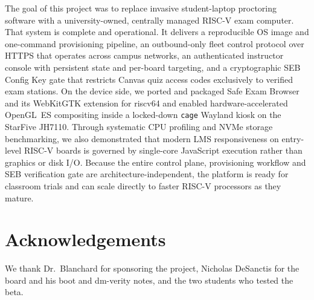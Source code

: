 \documentclass[11pt]{article}
\begin{document}
The goal of this project was to replace invasive student-laptop proctoring software with a university-owned, centrally managed RISC-V exam computer. That system is complete and operational. It delivers a reproducible OS image and one-command provisioning pipeline, an outbound-only fleet control protocol over HTTPS that operates across campus networks, an authenticated instructor console with persistent state and per-board targeting, and a cryptographic SEB Config Key gate that restricts Canvas quiz access codes exclusively to verified exam stations. On the device side, we ported and packaged Safe Exam Browser and its WebKitGTK extension for riscv64 and enabled hardware-accelerated OpenGL~ES compositing inside a locked-down \texttt{cage} Wayland kiosk on the StarFive JH7110. Through systematic CPU profiling and NVMe storage benchmarking, we also demonstrated that modern LMS responsiveness on entry-level RISC-V boards is governed by single-core JavaScript execution rather than graphics or disk I/O. Because the entire control plane, provisioning workflow and SEB verification gate are architecture-independent, the platform is ready for classroom trials and can scale directly to faster RISC-V processors as they mature.

\section*{Acknowledgements}
We thank Dr.~Blanchard for sponsoring the project, Nicholas DeSanctis for the board and his boot and dm-verity notes, and the two students who tested the beta.
\end{document}
